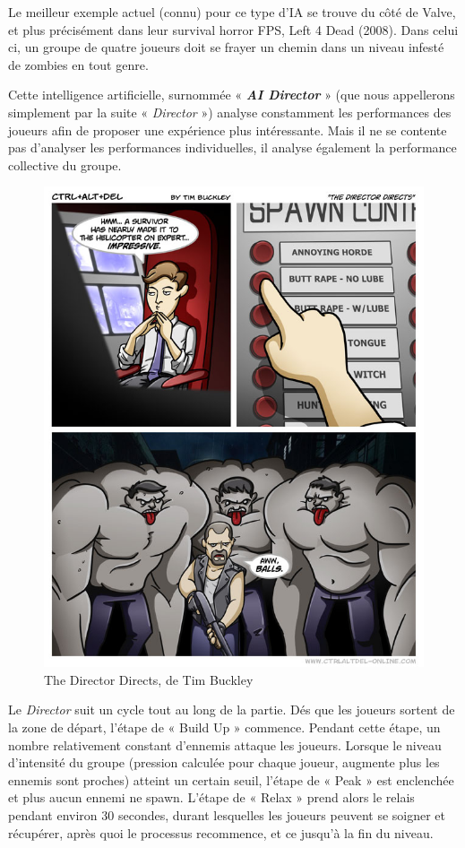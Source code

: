 \documentclass[a4paper, 12pt]{article} %
\begin{document}
Le meilleur exemple actuel (connu) pour ce type d’IA se trouve du côté de Valve, et plus précisément dans leur survival horror FPS, Left 4 Dead (2008). Dans celui ci, un groupe de quatre joueurs doit se frayer un chemin dans un niveau infesté de zombies en tout genre.

Cette intelligence artificielle, surnommée « \textbf{\textit{AI Director}} » (que nous appellerons simplement par la suite « \textit{Director} ») analyse constamment les performances des joueurs afin de proposer une expérience plus intéressante. Mais il ne se contente pas d’analyser les performances individuelles, il analyse également la performance collective du groupe.

\begin{figure}[!h]%
	\begin{center} 
		\includegraphics[width=0.60\columnwidth]{images/aiDirector.png}%
		\caption{The Director Directs, de Tim Buckley}%
	\end{center}
\end{figure}

Le \textit{Director} suit un cycle tout au long de la partie. Dés que les joueurs sortent de la zone de départ, l’étape de « Build Up » commence. Pendant cette étape, un nombre relativement constant d'ennemis attaque les joueurs. Lorsque le niveau d’intensité du groupe (pression calculée pour chaque joueur, augmente plus les ennemis sont proches) atteint un certain seuil, l’étape de « Peak » est enclenchée et plus aucun ennemi ne spawn. L’étape de « Relax » prend alors le relais pendant environ 30 secondes, durant lesquelles les joueurs peuvent se soigner et récupérer, après quoi le processus recommence, et ce jusqu’à la fin du niveau.
\end{document}
